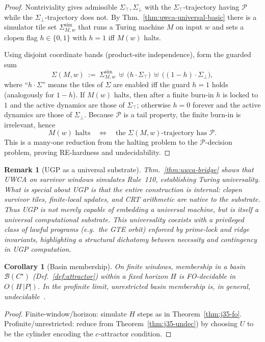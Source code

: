 \documentclass[12pt]{article}
\newtheorem{corollary}[theorem]{Corollary}
\newtheorem{remark}[theorem]{Remark}
\numberwithin{equation}{section}
\begin{document}
\begin{proof}
Nontriviality gives admissible $\Sigma_\top,\Sigma_\bot$ with the $\Sigma_\top$-trajectory having $\mathcal{P}$ while the $\Sigma_\bot$-trajectory does not. By Thm.~\ref{thm:uwca-universal-basic} there is a simulator tile set $\Sigma^{\mathrm{sim}}_{M,w}$ that runs a Turing machine $M$ on input $w$ and sets a clopen flag $h\in\{0,1\}$ with $h{=}1$ iff $M(w)$ halts.

Using disjoint coordinate bands (product-site independence), form the guarded sum
\[
\Sigma(M,w)\ :=\ \Sigma^{\mathrm{sim}}_{M,w}\ \uplus\ \big(h\cdot \Sigma_\top\big)\ \uplus\ \big((1-h)\cdot \Sigma_\bot\big),
\]
where ``$h\cdot\Sigma$'' means the tiles of $\Sigma$ are enabled iff the guard $h{=}1$ holds (analogously for $1{-}h$). If $M(w)$ halts, then after a finite burn-in $h$ is locked to $1$ and the active dynamics are those of $\Sigma_\top$; otherwise $h=0$ forever and the active dynamics are those of $\Sigma_\bot$. Because $\mathcal{P}$ is a tail property, the finite burn-in is irrelevant, hence
\[
M(w)\text{ halts}\quad\Longleftrightarrow\quad \text{the $\Sigma(M,w)$-trajectory has $\mathcal{P}$}.
\]
This is a many-one reduction from the halting problem to the $\mathcal{P}$-decision problem, proving RE-hardness and undecidability.
\end{proof}


\begin{remark}[UGP as a universal substrate]
Thm.~\ref{thm:uwca-bridge} shows that UWCA on survivor windows simulates Rule~110,
establishing Turing universality. What is special about UGP is that the entire construction
is internal: clopen survivor tiles, finite-local updates, and CRT arithmetic are native to
the substrate. Thus UGP is not merely capable of embedding a universal machine, but is
itself a universal computational substrate. This universality coexists with a privileged
class of lawful programs (e.g.\ the GTE orbit) enforced by prime-lock and ridge invariants,
highlighting a structural dichotomy between necessity and contingency in UGP computation.
\end{remark}

\begin{corollary}[Basin membership]\label{cor:j35-basin}
On finite windows, membership in a basin $\mathcal{B}(C^\star)$ (Def.~\ref{def:attractor}) within a fixed horizon $H$ is FO-decidable in $O(H\,|P|)$. In the profinite limit, unrestricted basin membership is, in general, undecidable~\cite{SpivackUGPFormalization,ugp-lean}.
\end{corollary}
\begin{proof}
Finite-window/horizon: simulate $H$ steps as in Theorem~\ref{thm:j35-fo}. Profinite/unrestricted: reduce from Theorem~\ref{thm:j35-undec}) by choosing $U$ to be the cylinder encoding the $c$-attractor condition.
\end{proof}
\end{document}
